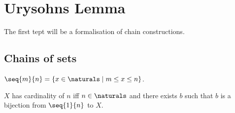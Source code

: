 







\section{Urysohns Lemma}


The first tept will be a formalisation of chain constructions.

\subsection{Chains of sets}


\begin{definition}\label{one_to_n_set}
    $\seq{m}{n} = \{x \in \naturals \mid  m \leq x \leq n\}$.   
\end{definition}

\begin{definition}\label{cardinality}
    $X$ has cardinality of $n$ iff
    $n \in \naturals$ and there exists $b$ such that $b$ is a bijection from $\seq{1}{n}$ to $X$.
\end{definition}




